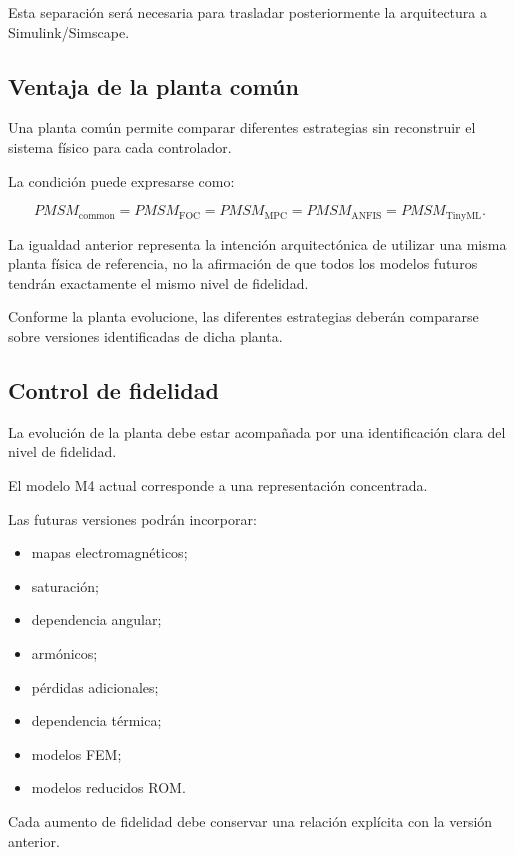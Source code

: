 Esta separación será necesaria para trasladar posteriormente la arquitectura a Simulink/Simscape.

\subsection{Ventaja de la planta común}

Una planta común permite comparar diferentes estrategias sin reconstruir el sistema físico para cada controlador.

La condición puede expresarse como:

\begin{equation}
PMSM_{\mathrm{common}}
=
PMSM_{\mathrm{FOC}}
=
PMSM_{\mathrm{MPC}}
=
PMSM_{\mathrm{ANFIS}}
=
PMSM_{\mathrm{TinyML}}.
\end{equation}

La igualdad anterior representa la intención arquitectónica de utilizar una misma planta física de referencia, no la afirmación de que todos los modelos futuros tendrán exactamente el mismo nivel de fidelidad.

Conforme la planta evolucione, las diferentes estrategias deberán compararse sobre versiones identificadas de dicha planta.

\subsection{Control de fidelidad}

La evolución de la planta debe estar acompañada por una identificación clara del nivel de fidelidad.

El modelo M4 actual corresponde a una representación concentrada.

Las futuras versiones podrán incorporar:

\begin{itemize}
    \item mapas electromagnéticos;
    \item saturación;
    \item dependencia angular;
    \item armónicos;
    \item pérdidas adicionales;
    \item dependencia térmica;
    \item modelos FEM;
    \item modelos reducidos ROM.
\end{itemize}

Cada aumento de fidelidad debe conservar una relación explícita con la versión anterior.

